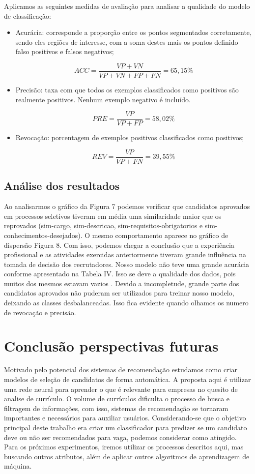 \documentclass[conference]{IEEEtran}
\begin{document}
Aplicamos as seguintes medidas  de avaliação para analisar a qualidade do modelo de classificação:
\begin{itemize}
\item Acurácia: corresponde a proporção entre os pontos segmentados corretamente, sendo eles regiões de interesse, com a soma destes mais os pontos definido falso positivos e falsos negativos;

     \[ACC = \frac{VP + VN}{VP+VN+FP+FN} = 65,15\%\]

\item Precisão: taxa com que todos os exemplos classificados como positivos são realmente positivos. Nenhum exemplo negativo é incluído.

    \[PRE = \frac{VP}{VP+FP} = 58,02\%\]

\item  Revocação: porcentagem de exemplos positivos classificados como positivos;

    \[REV = \frac{VP}{VP+FN} = 39,55\%\]
\end{itemize}

    
    \subsection{Análise dos resultados}

	 Ao analisarmos o gráfico da Figura 7 podemos verificar que candidatos aprovados em processos seletivos tiveram em média uma similaridade maior que os reprovados (sim-cargo, sim-descricao, sim-requisitos-obrigatorios e sim-conhecimentos-desejados). 
     O mesmo comportamento aparece no gráfico de dispersão Figura 8. Com isso, podemos chegar a conclusão que a experiência profissional e as atividades exercidas anteriormente tiveram grande influência na tomada de decisão dos recrutadores.
     Nosso modelo não teve uma grande acurácia conforme apresentado na Tabela IV. Isso se deve a qualidade dos dados, pois muitos dos mesmos estavam vazios . Devido a incompletude, grande parte dos candidatos aprovados não puderam ser utilizados para treinar nosso modelo, deixando as classes desbalanceadas. Isso fica evidente quando olhamos os numero de revocação e precisão.
	   
\section*{Conclusão perspectivas futuras}

    Motivado pelo potencial dos sistemas de recomendação estudamos como criar modelos de seleção de candidatos de forma automática. A proposta aqui é utilizar uma rede neural para aprender o que é relevante para empresas no quesito de analise de currículo.
    O volume de currículos dificulta o processo de busca e filtragem de informações, com isso, sistemas de recomendação se tornaram importantes e necessários para auxiliar usuários.
    Considerando-se que o objetivo principal deste trabalho era criar um classificador para predizer se um candidato deve ou não ser recomendados para vaga, podemos considerar como atingido.
    Para os próximos experimentos, iremos utilizar os processos descritos aqui, mas buscando outros atributos, além de aplicar outros algoritmos de aprendizagem de máquina.
\end{document}
